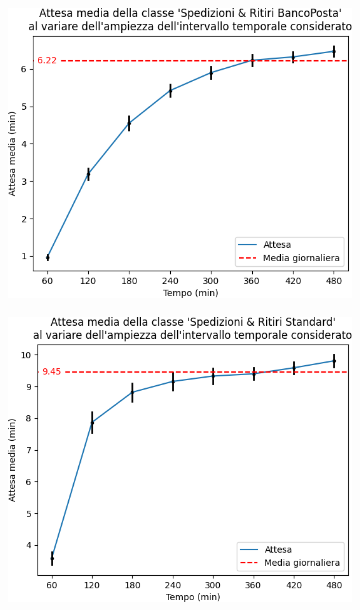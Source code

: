 \documentclass[
	usepdftitle=false,
	xcolor={table, dvipsnames},
	hyperref={
		pdftitle={Studio delle prestazioni di un Ufficio Postale ispirato a Poste Italiane},
    	pdfauthor={A. Chillotti, C. Cuffaro e S. Tiberi}
    }
]{beamer}
\begin{document}
\begin{frame}
\begin{figure}[ht]
\begin{subfigure}[b]{0.3\textwidth}
\includegraphics[width=\textwidth]{plots/day-from-empty-4}   
\end{subfigure}
\begin{subfigure}[b]{0.3\textwidth}   
\centering 
\includegraphics[width=\textwidth]{plots/day-from-empty-5}    
\end{subfigure}
\end{figure}
\end{frame}
\end{document}
